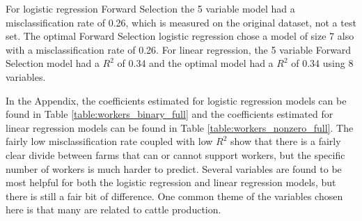 \documentclass{article}
\begin{document}
For logistic regression Forward Selection the 5 variable model had a misclassification rate of 0.26, which is measured on the 
original dataset, not a test set. The optimal Forward Selection logistic regression chose a model of size 7 also with a 
misclassification rate of 0.26. For linear regression, the 5 variable Forward Selection model had a $R^2$ of 0.34 and the 
optimal model had a $R^2$ of 0.34 using 8 variables. 

In the Appendix, the coefficients estimated for logistic regression models can be found in Table \ref{table:workers_binary_full} 
and the coefficients estimated for linear regression models can be found in Table \ref{table:workers_nonzero_full}. The fairly 
low misclassification rate coupled with low $R^2$ show that there is a fairly clear divide between farms that can or cannot 
support workers, but the specific number of workers is much harder to predict. Several variables are found to be most helpful 
for both the logistic regression and linear regression models, but there is still a fair bit of difference. One common theme of the 
variables chosen here is that many are related to cattle production.
\end{document}
